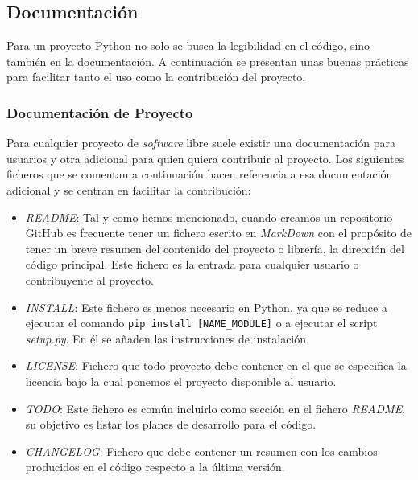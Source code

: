 \subsection*{Documentación}
Para un proyecto Python no solo se busca la legibilidad en el código, sino también en la documentación. A continuación se presentan unas buenas prácticas para facilitar tanto el uso como la contribución del proyecto. 
\subsubsection*{Documentación de  Proyecto}
Para cualquier proyecto de \emph{software} libre suele existir una documentación para usuarios y otra adicional para quien quiera contribuir al proyecto. Los siguientes ficheros que se comentan a continuación hacen referencia a esa documentación adicional y se centran en facilitar la contribución:\\
\begin{itemize}
    \item \textit{README}: Tal y como hemos mencionado, cuando creamos un repositorio GitHub es frecuente tener un fichero escrito en \emph{MarkDown} con el propósito de tener un breve resumen del contenido del proyecto o librería, la dirección del código principal. Este fichero es la entrada para cualquier usuario o contribuyente al proyecto. 
    \item \textit{INSTALL}: Este fichero es menos necesario en Python, ya que se reduce a ejecutar el comando \texttt{pip install [NAME\_MODULE]} o a ejecutar el script \emph{setup.py}. En él se añaden las instrucciones de instalación.
    \item \textit{LICENSE}: Fichero que todo proyecto debe contener en el que se especifica la licencia bajo la cual ponemos el proyecto disponible al usuario.
    \item \textit{TODO}: Este fichero es común incluirlo como sección en el fichero \emph{README}, su objetivo es listar los planes de desarrollo para el código.
    \item \textit{CHANGELOG}: Fichero que debe contener un resumen con los cambios producidos en el código respecto a la última versión.
\end{itemize}

